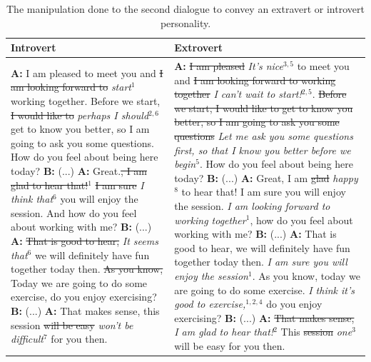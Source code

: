 \documentclass[nomenclature, english, biblatex]{kththesis}
\begin{document}
\begin{table}
    \centering
    \begin{adjustbox}{max width=\textwidth}
        \begin{tabular}{|p{}|p{}|}
        \hline
        Introvert & Extrovert \\
        \hline
        \hline
        \textbf{A:} I am pleased to meet you and \sout{I am looking forward to} \textit{start}$^1$ working together. Before we start, \sout{I would like to} \textit{perhaps I should}$^{2,6}$ get to know you better, so I am going to ask you some questions. How do you feel about being here today?\newline
        \textbf{B:} (...)\newline
        \textbf{A:} Great.\sout{, I am glad to hear that!}$^1$ \sout{I am sure} \textit{I think that}$^6$ you will enjoy the session. And how do you feel about working with me?\newline
        \textbf{B:} (...)\newline
        \textbf{A:} \sout{That is good to hear,} \textit{It seems that}$^6$ we will definitely have fun together today then. \sout{As you know,} Today we are going to do some exercise, do you enjoy exercising? \newline
        \textbf{B:} (...)\newline
        \textbf{A:} That makes sense, this session \sout{will be easy} \textit{won't be difficult}$^7$ for you then.
        &
        \textbf{A:} \sout{I am pleased} \textit{It's nice}$^{3,5}$ to meet you and \sout{I am looking forward to working together} \textit{I can't wait to start!}$^{2,5}$. \sout{Before we start, I would like to get to know you better, so I am going to ask you some questions} \textit{Let me ask you some questions first, so that I know you better before we begin}$^5$. How do you feel about being here today?\newline
        \textbf{B:} (...)\newline
        \textbf{A:} Great, I am \sout{glad} \textit{happy}$^8$ to hear that! I am sure you will enjoy the session. \textit{I am looking forward to working together}$^1$, how do you feel about working with me?\newline
        \textbf{B:} (...)\newline
        \textbf{A:} That is good to hear, we will definitely have fun together today then. \textit{I am sure you will enjoy the session}$^1$. As you know, today we are going to do some exercise. \textit{I think it's good to exercise,}$^{1,2,4}$ do you enjoy exercising? \newline
        \textbf{B:} (...)\newline
        \textbf{A:} \sout{That makes sense,} \textit{I am glad to hear that!}$^2$ This \sout{session} \textit{one}$^3$ will be easy for you then.\\
        \hline
        \end{tabular}
    \end{adjustbox}
    \caption{The manipulation done to the second dialogue to convey an extravert or introvert personality.}
    \label{tab:other_hand_crafted_2}
\end{table}
\end{document}
